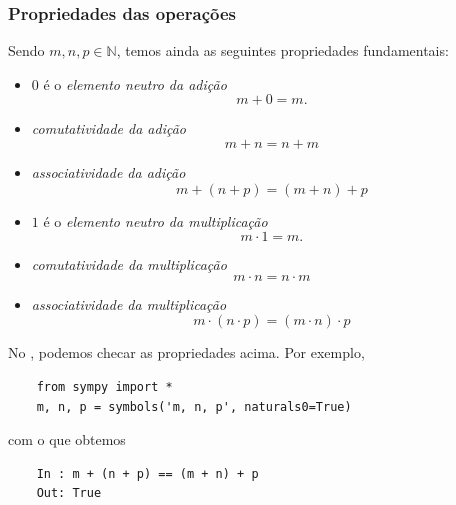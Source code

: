\subsubsection{Propriedades das operações}

Sendo $m, n, p\in\mathbb{N}$, temos ainda as seguintes propriedades fundamentais:
\begin{itemize}
\item $0$ é o \emph{elemento neutro da adição}
  \begin{equation}
    m + 0 = m.
  \end{equation}
\item \emph{comutatividade da adição}
  \begin{equation}
    m + n = n + m
  \end{equation}
\item \emph{associatividade da adição}
  \begin{equation}
    m + (n + p) = (m + n) + p
  \end{equation}
\item $1$ é o \emph{elemento neutro da multiplicação}
  \begin{equation}
    m \cdot 1 = m.
  \end{equation}
\item \emph{comutatividade da multiplicação}
  \begin{equation}
    m \cdot n = n \cdot m
  \end{equation}
\item \emph{associatividade da multiplicação}
  \begin{equation}
    m \cdot (n \cdot p) = (m \cdot n) \cdot p
  \end{equation}
\end{itemize}

\ifispython
\begin{obs}
  No \python, podemos checar as propriedades acima. Por exemplo,
  \begin{lstlisting}
    from sympy import *
    m, n, p = symbols('m, n, p', naturals0=True)
  \end{lstlisting}
  com o que obtemos
  \begin{lstlisting}
    In : m + (n + p) == (m + n) + p
    Out: True
  \end{lstlisting}
\end{obs}
\fi

